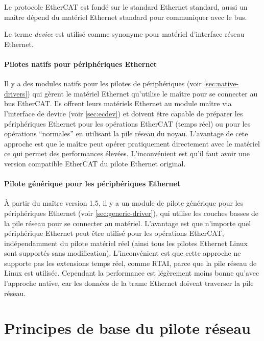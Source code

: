 \documentclass[a4paper,12pt,BCOR6mm,bibtotoc,idxtotoc]{scrbook}
\begin{document}
Le protocole EtherCAT est fond\'e sur le standard Ethernet standard,
aussi un ma\^itre d\'epend du mat\'eriel Ethernet standard pour communiquer
avec le bus.

Le terme \textit{device} est utilis\'e comme synonyme pour mat\'eriel
d'interface r\'eseau Ethernet.

\paragraph{Pilotes natifs pour p\'eriph\'eriques Ethernet}
Il y a des modules natifs pour les pilotes de p\'eriph\'eriques (voir
\autoref{sec:native-drivers}) qui g\`erent le mat\'eriel Ethernet
qu'utilise le ma\^itre pour se connecter au bus EtherCAT. Ils offrent
leurs mat\'eriels Ethernet au module ma\^itre via l'interface de
device (voir \autoref{sec:ecdev}) et doivent \^etre capable de
pr\'eparer les p\'eriph\'eriques Ethernet pour les op\'erations
EtherCAT (temps r\'eel) ou pour les op\'erations ``normales'' en
utilisant la pile r\'eseau du noyau. L'avantage de cete approche est
que le ma\^itre peut op\'erer pratiquement directement avec le
mat\'eriel ce qui permet des performances
\'elev\'ees. L'inconv\'enient est qu'il faut avoir une version
compatible EtherCAT du pilote Ethernet original.

\paragraph{Pilote g\'en\'erique pour les p\'eriph\'eriques Ethernet}
\`A partir du ma\^itre version 1.5, il y a un module de pilote
g\'en\'erique pour les p\'eriph\'eriques Ethernet (voir
\autoref{sec:generic-driver}), qui utilise les couches basses de la
pile r\'eseau pour se connecter au mat\'eriel. L'avantage est que
n'importe quel p\'eriph\'erique Ethernet peut \^etre utilis\'e pour les
op\'erations EtherCAT, ind\'ependamment du pilote mat\'eriel r\'eel
(ainsi tous les pilotes Ethernet Linux sont support\'es sans
modification). L'inconv\'enient est que cette approche ne supporte
pas les extensions temps r\'eel, comme RTAI, parce que la pile
r\'eseau de Linux est utilis\'ee. Cependant la performance est
l\'eg\`erement moins bonne qu'avec l'approche native, car les donn\'ees
de la trame Ethernet doivent traverser la pile r\'eseau.


\section{Principes de base du pilote r\'eseau}
\label{sec:networkdrivers}
\end{document}
